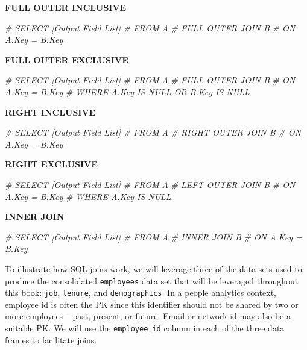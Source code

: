 \documentclass[
]{book}
\newenvironment{Shaded}{\begin{snugshade}}{\end{snugshade}}
\newcommand{\CommentTok}[1]{\textcolor[rgb]{0.56,0.35,0.01}{\textit{#1}}}
\begin{document}
\textbf{FULL OUTER INCLUSIVE}

\begin{Shaded}
\begin{Highlighting}[]
\CommentTok{\#  SELECT [Output Field List]}
\CommentTok{\#  FROM A }
\CommentTok{\#  FULL OUTER JOIN B}
\CommentTok{\#  ON A.Key = B.Key}
\end{Highlighting}
\end{Shaded}

\textbf{FULL OUTER EXCLUSIVE}

\begin{Shaded}
\begin{Highlighting}[]
\CommentTok{\#  SELECT [Output Field List]}
\CommentTok{\#  FROM A }
\CommentTok{\#  FULL OUTER JOIN B}
\CommentTok{\#  ON A.Key = B.Key}
\CommentTok{\#  WHERE A.Key IS NULL OR B.Key IS NULL  }
\end{Highlighting}
\end{Shaded}

\textbf{RIGHT INCLUSIVE}

\begin{Shaded}
\begin{Highlighting}[]
\CommentTok{\#  SELECT [Output Field List]}
\CommentTok{\#  FROM A }
\CommentTok{\#  RIGHT OUTER JOIN B}
\CommentTok{\#  ON A.Key = B.Key}
\end{Highlighting}
\end{Shaded}

\textbf{RIGHT EXCLUSIVE}

\begin{Shaded}
\begin{Highlighting}[]
\CommentTok{\#  SELECT [Output Field List]}
\CommentTok{\#  FROM A }
\CommentTok{\#  LEFT OUTER JOIN B}
\CommentTok{\#  ON A.Key = B.Key}
\CommentTok{\#  WHERE A.Key IS NULL}
\end{Highlighting}
\end{Shaded}

\textbf{INNER JOIN}

\begin{Shaded}
\begin{Highlighting}[]
\CommentTok{\#  SELECT [Output Field List]}
\CommentTok{\#  FROM A }
\CommentTok{\#  INNER JOIN B}
\CommentTok{\#  ON A.Key = B.Key}
\end{Highlighting}
\end{Shaded}

To illustrate how SQL joins work, we will leverage three of the data sets used to produce the consolidated \texttt{employees} data set that will be leveraged throughout this book: \texttt{job}, \texttt{tenure}, and \texttt{demographics}. In a people analytics context, employee id is often the PK since this identifier should not be shared by two or more employees -- past, present, or future. Email or network id may also be a suitable PK. We will use the \texttt{employee\_id} column in each of the three data frames to facilitate joins.
\end{document}
